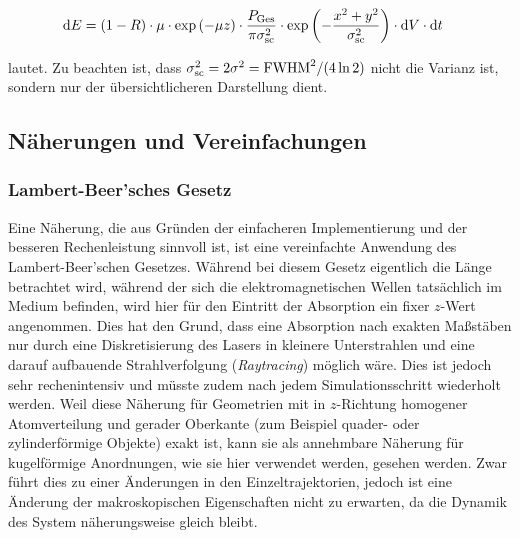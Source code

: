 		\begin{align}
			\dx[E] &= (1-R) \cdot \mu \cdot \exp\left(-\mu z\right)
				\cdot \frac{P_\text{Ges}}{\pi \sigma_\text{sc}^2}
				\cdot \exp\left(-\frac{x^2 + y^2}{\sigma_\text{sc}^2}\right)
				\cdot \dx[V] \cdot \dt
		\end{align}

		lautet. Zu beachten ist, dass $\sigma_\text{sc}^2 = 2\sigma^2 = \fwhm^2/(4\ln2)$ nicht die
		Varianz ist, sondern nur der übersichtlicheren Darstellung dient.

	\subsection{Näherungen und Vereinfachungen}
		\subsubsection{Lambert-Beer'sches Gesetz}
		Eine Näherung, die aus Gründen der einfacheren Implementierung und der besseren
		Rechenleistung sinnvoll ist, ist eine vereinfachte Anwendung des Lambert-Beer'schen
		Gesetzes. Während bei diesem Gesetz eigentlich die Länge betrachtet wird, während der sich
		die elektromagnetischen Wellen tatsächlich im Medium befinden, wird hier für den Eintritt
		der Absorption ein fixer $z$-Wert angenommen. Dies hat den Grund, dass eine Absorption
		nach exakten Maßstäben nur durch eine Diskretisierung des Lasers in kleinere Unterstrahlen
		und eine darauf aufbauende Strahlverfolgung (\emph{Raytracing}) möglich wäre. Dies ist
		jedoch sehr rechenintensiv und müsste zudem nach jedem Simulationsschritt wiederholt
		werden. Weil diese Näherung für Geometrien mit in $z$-Richtung homogener Atomverteilung
		und gerader Oberkante (zum Beispiel quader- oder zylinderförmige Objekte) exakt ist, kann
		sie als annehmbare Näherung für kugelförmige Anordnungen, wie sie hier verwendet werden,
		gesehen werden. Zwar führt dies zu einer Änderungen in den Einzeltrajektorien, jedoch ist
		eine Änderung der makroskopischen Eigenschaften nicht zu erwarten, da die Dynamik des
		System näherungsweise gleich bleibt.

